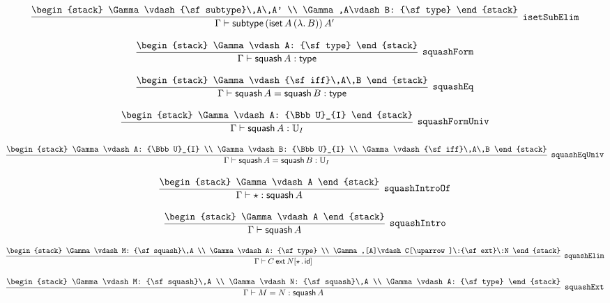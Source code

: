 \[
\infer[{\tt isetSubElim}]{\Gamma \vdash {\sf subtype}\,({\sf iset}\,A\,(\lambda .\,B))\,A'}{
\begin{stack}
\Gamma \vdash {\sf subtype}\,A\,A'
\\
\Gamma ,A\vdash B: {\sf type}
\end{stack}}
\]

\[
\infer[{\tt squashForm}]{\Gamma \vdash {\sf squash}\,A: {\sf type}}{
\begin{stack}
\Gamma \vdash A: {\sf type}
\end{stack}}
\]

\[
\infer[{\tt squashEq}]{\Gamma \vdash {\sf squash}\,A= {\sf squash}\,B: {\sf type}}{
\begin{stack}
\Gamma \vdash {\sf iff}\,A\,B
\end{stack}}
\]

\[
\infer[{\tt squashFormUniv}]{\Gamma \vdash {\sf squash}\,A: {\Bbb U}_{I}}{
\begin{stack}
\Gamma \vdash A: {\Bbb U}_{I}
\end{stack}}
\]

\[
\infer[{\tt squashEqUniv}]{\Gamma \vdash {\sf squash}\,A= {\sf squash}\,B: {\Bbb U}_{I}}{
\begin{stack}
\Gamma \vdash A: {\Bbb U}_{I}
\\
\Gamma \vdash B: {\Bbb U}_{I}
\\
\Gamma \vdash {\sf iff}\,A\,B
\end{stack}}
\]

\[
\infer[{\tt squashIntroOf}]{\Gamma \vdash \star : {\sf squash}\,A}{
\begin{stack}
\Gamma \vdash A
\end{stack}}
\]

\[
\infer[{\tt squashIntro}]{\Gamma \vdash {\sf squash}\,A}{
\begin{stack}
\Gamma \vdash A
\end{stack}}
\]

\[
\infer[{\tt squashElim}]{\Gamma \vdash C\:{\sf ext}\:N[\star \,.\,{\sf id}]}{
\begin{stack}
\Gamma \vdash M: {\sf squash}\,A
\\
\Gamma \vdash A: {\sf type}
\\
\Gamma ,[A]\vdash C[\uparrow ]\:{\sf ext}\:N
\end{stack}}
\]

\[
\infer[{\tt squashExt}]{\Gamma \vdash M= N: {\sf squash}\,A}{
\begin{stack}
\Gamma \vdash M: {\sf squash}\,A
\\
\Gamma \vdash N: {\sf squash}\,A
\\
\Gamma \vdash A: {\sf type}
\end{stack}}
\]


